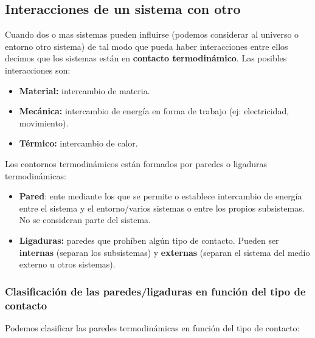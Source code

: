 \documentclass[12pt,a4paper]{article}
\begin{document}
\subsection{Interacciones de un sistema con otro}
Cuando dos o mas sistemas pueden influirse (podemos considerar al universo o entorno otro sistema) de tal modo que pueda haber interacciones entre ellos decimos que los sistemas están en \textbf{contacto termodinámico}. Las posibles interacciones son:

\begin{itemize}

\item \textbf{Material:} intercambio de materia.

\item \textbf{Mecánica:} intercambio de energía en forma de trabajo (ej: electricidad, movimiento).

\item \textbf{Térmico:} intercambio de calor.

\end{itemize}

Los contornos termodinámicos están formados por paredes o ligaduras termodinámicas:

 \begin{itemize}

\item \textbf{Pared}: ente mediante los que se permite o establece intercambio de energía entre el sistema y el entorno/varios sistemas o entre los propios subsistemas. No se consideran parte del sistema. \\

\item \textbf{Ligaduras:} paredes que prohíben algún tipo de contacto. Pueden ser \textbf{internas} (separan los subsistemas) y \textbf{externas} (separan el sistema del medio externo u otros sistemas). \\

\end{itemize}

\subsubsection{Clasificación de las paredes/ligaduras en función del tipo de contacto}

Podemos clasificar las paredes termodinámicas en función del tipo de contacto:
\end{document}
